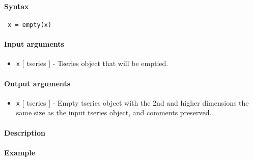


	\paragraph{Syntax}
 
 \begin{verbatim}
 x = empty(x)
 \end{verbatim}
 
 \paragraph{Input arguments}
 
 \begin{itemize}
 \item
   \texttt{x} {[} tseries {]} - Tseries object that will be emptied.
 \end{itemize}
 
 \paragraph{Output arguments}
 
 \begin{itemize}
 \item
   \texttt{x} {[} tseries {]} - Empty tseries object with the 2nd and
   higher dimensions the same size as the input tseries object, and
   comments preserved.
 \end{itemize}
 
 \paragraph{Description}
 
 \paragraph{Example}


